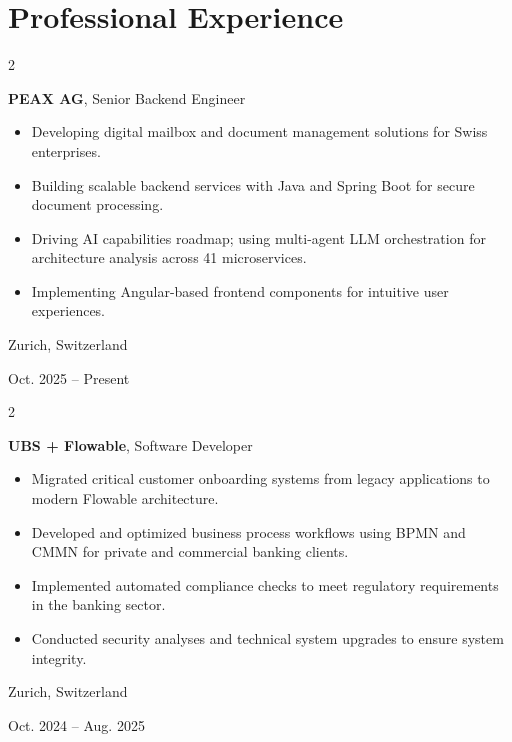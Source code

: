 \documentclass[11pt, letterpaper]{article}
\newenvironment{highlights}{
    \begin{itemize}[
        topsep=0.10cm,
        parsep=0.10cm,
        partopsep=0pt,
        itemsep=0pt,
        leftmargin=0.4cm + 10pt
    ]
}{
    \end{itemize}
}
\newenvironment{twocolentry}[2][]{
    \onecolentry
    \def\secondColumn{#2}
    \setcolumnwidth{\fill, 4.5cm}
    \begin{paracol}{2}
}{
    \switchcolumn \raggedleft \secondColumn
    \end{paracol}
    \endonecolentry
}
\let\hrefWithoutArrow\href
\renewcommand{\href}[2]{\hrefWithoutArrow{#1}{\mbox{\ifthenelse{\equal{#2}{}}{ }{#2 }\raisebox{.15ex}{\footnotesize \faExternalLink*}}}}
\begin{document}
    \section{Professional Experience}

\begin{twocolentry}{
    Zurich, Switzerland  

    Oct. 2025 – Present  
}
\textbf{PEAX AG}, Senior Backend Engineer  
\begin{highlights}  
   \item Developing digital mailbox and document management solutions for Swiss enterprises.
   \item Building scalable backend services with Java and Spring Boot for secure document processing.
   \item Driving AI capabilities roadmap; using multi-agent LLM orchestration for architecture analysis across 41 microservices.
   \item Implementing Angular-based frontend components for intuitive user experiences.
\end{highlights}   
\end{twocolentry}

\vspace{0.2 cm}

\begin{twocolentry}{
    Zurich, Switzerland  

    Oct. 2024 – Aug. 2025  
}
\textbf{UBS + Flowable}, Software Developer  
\begin{highlights}  
   \item Migrated critical \href{https://ubs.com}{UBS} customer onboarding systems from legacy applications to modern Flowable architecture.
   \item Developed and optimized business process workflows using BPMN and CMMN for private and commercial banking clients.
   \item Implemented automated compliance checks to meet regulatory requirements in the banking sector.
   \item Conducted security analyses and technical system upgrades to ensure system integrity.
\end{highlights}   
\end{twocolentry}  


\vspace{0.2 cm}
\end{document}
